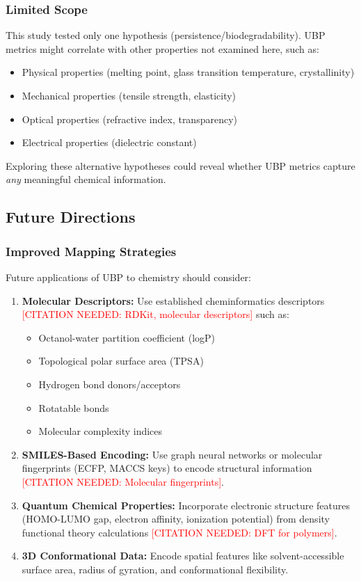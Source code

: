 \documentclass[11pt,letterpaper]{article}
\begin{document}
\subsubsection{Limited Scope}
This study tested only one hypothesis (persistence/biodegradability). UBP metrics might correlate with other properties not examined here, such as:
\begin{itemize}
    \item Physical properties (melting point, glass transition temperature, crystallinity)
    \item Mechanical properties (tensile strength, elasticity)
    \item Optical properties (refractive index, transparency)
    \item Electrical properties (dielectric constant)
\end{itemize}

Exploring these alternative hypotheses could reveal whether UBP metrics capture \textit{any} meaningful chemical information.

\subsection{Future Directions}

\subsubsection{Improved Mapping Strategies}
Future applications of UBP to chemistry should consider:

\begin{enumerate}
    \item \textbf{Molecular Descriptors:} Use established cheminformatics descriptors \textcolor{red}{[CITATION NEEDED: RDKit, molecular descriptors]} such as:
    \begin{itemize}
        \item Octanol-water partition coefficient (logP)
        \item Topological polar surface area (TPSA)
        \item Hydrogen bond donors/acceptors
        \item Rotatable bonds
        \item Molecular complexity indices
    \end{itemize}

    \item \textbf{SMILES-Based Encoding:} Use graph neural networks or molecular fingerprints (ECFP, MACCS keys) to encode structural information \textcolor{red}{[CITATION NEEDED: Molecular fingerprints]}.

    \item \textbf{Quantum Chemical Properties:} Incorporate electronic structure features (HOMO-LUMO gap, electron affinity, ionization potential) from density functional theory calculations \textcolor{red}{[CITATION NEEDED: DFT for polymers]}.

    \item \textbf{3D Conformational Data:} Encode spatial features like solvent-accessible surface area, radius of gyration, and conformational flexibility.
\end{enumerate}
\end{document}
